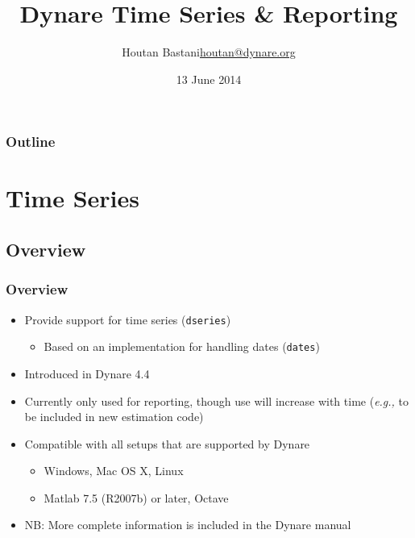 \documentclass[10pt]{beamer}
\title{Dynare Time Series \& Reporting}
\author[Houtan Bastani]{Houtan Bastani\newline\href{mailto:houtan@dynare.org}{houtan@dynare.org}}
\institute{CEPREMAP}
\date{13 June 2014}
\newcommand{\myitem}{\item[$\bullet$]}
\begin{document}
\begin{frame}
  \titlepage
\end{frame}

\begin{frame}[t]
  \frametitle{Outline}
  \tableofcontents
\end{frame}

%
%
\section{Time Series}

\subsection{Overview}
\begin{frame}[fragile,t]
  \frametitle{Overview}
  \begin{itemize}
  \myitem Provide support for time series (\texttt{dseries})
    \begin{itemize}
    \myitem Based on an implementation for handling dates (\texttt{dates})
    \end{itemize}
  \myitem Introduced in Dynare 4.4
  \myitem Currently only used for reporting, though use will increase with time
    (\textit{e.g.,} to be included in new estimation code)
  \myitem Compatible with all setups that are supported by Dynare
    \begin{itemize}
    \myitem Windows, Mac OS X, Linux
    \myitem Matlab 7.5 (R2007b) or later, Octave
    \end{itemize}
  \myitem NB: More complete information is included in the Dynare manual
  \end{itemize}
\end{frame}
\end{document}
